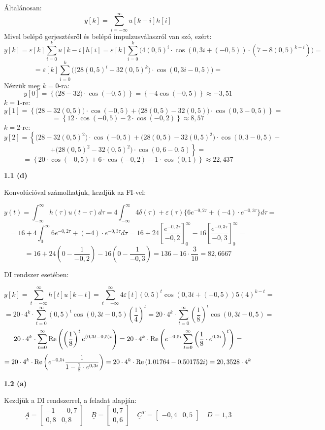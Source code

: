 \documentclass[12pt,a4paper]{article}
\newcommand\uuline[1]{\underline{\underline{#1}}}
\newcommand\uline[1]{\underline{#1}}
\begin{document}
Általánosan:
\[y[k] = \sum_{i=-\infty}^{\infty} u[k-i]h[i]\]
Mivel belépő gerjesztésről és belépő impulzusválaszról van szó, ezért:
\[y[k] = \varepsilon[k]\sum_{i=0}^{k} u[k-i]h[i] = \varepsilon[k]\sum_{i=0}^{k}\Big( 4(0,5)^i\cdot\cos(0,3i+(-0,5))\cdot(7-8(0,5)^{k-i}) \Big) =\]
\[= \varepsilon[k]\sum_{i=0}^{k}\Big(\big(28(0,5)^i-32 (0,5)^k\big)\cdot  \cos(0,3i-0,5)\Big) = \]
Nézzük meg $k=0$-ra:
\[y[0] = \left\{\big(28-32\big)\cdot  \cos(-0,5)\right\} = \left\{-4 \cos(-0,5)\right\} \approx -3,51\]
$k=1$-re:
\[y[1] = \left\{\big(28-32 (0,5)\big)\cdot  \cos(-0,5)+\big(28(0,5)-32 (0,5)\big)\cdot  \cos(0,3-0,5)\right\} = \]
\[= \left\{12\cdot \cos(-0,5)-2\cdot  \cos(-0,2)\right\} \approx 8,57\]
$k=2$-re:
\[y[2] = \left\{\big(28-32 (0,5)^2\big)\cdot  \cos(-0,5)+\big(28(0,5)-32 (0,5)^2\big)\cdot  \cos(0,3-0,5)+\right.\]
\[\left.+\big(28(0,5)^2-32 (0,5)^2\big)\cdot  \cos(0,6-0,5)\right\}=\]
\[= \left\{20\cdot\cos(-0,5)+6\cdot  \cos(-0,2)-1\cdot  \cos(0,1)\right\} \approx 22,437\]

\textbf{1.1 (d)}

Konvolúcióval számolhatjuk, kezdjük az FI-vel:

\[y(t) = \int_{-\infty}^{\infty} h(\tau)u(t-\tau) d\tau = 4\int_{-\infty}^{\infty} 4\delta(\tau)+\varepsilon(\tau)\{6e^{-0,2\tau}+(-4)\cdot e^{-0,3\tau}\} d\tau =\]
\[= 16 + 4\int_{0}^{\infty} 6e^{-0,2\tau}+(-4)\cdot e^{-0,3\tau} d\tau = 16 + 24\left[\frac{e^{-0,2\tau}}{-0,2}\right]_0^{\infty}-16\left[\frac{e^{-0,3\tau}}{-0,3}\right]_0^{\infty}=\]
\[= 16 + 24\left(0-\frac{1}{-0,2}\right)-16\left(0-\frac{1}{-0,3}\right) = 136 - 16\cdot\frac{3}{10} = 82,6667\]

DI rendszer esetében:

\[y[k] = \sum_{t=-\infty}^{\infty} h[t]u[k-t] = \sum_{t=-\infty}^{\infty} 4\varepsilon[t](0,5)^t\cos(0,3t+(-0,5))5(4)^{k-t} =\]
\[= 20\cdot4^k\cdot \sum_{t=0}^{\infty} (0,5)^t\cos(0,3t-0,5)\left(\frac{1}{4}\right)^{t} = 20\cdot4^k\cdot \sum_{t=0}^{\infty} \left(\frac{1}{8}\right)^{t}\cos(0,3t-0,5) = \]
\[20\cdot4^k\cdot \sum_{t=0}^{\infty} \hbox{Re}\left(\left(\frac{1}{8}\right)^{t} e^{(0,3t-0,5)i}\right) = 20\cdot4^k\cdot \hbox{Re}\left(e^{-0,5i} \sum_{t=0}^{\infty} \left(\frac{1}{8}\cdot e^{0,3i}\right)^{t}\right) =\]
\[ = 20\cdot4^k\cdot \hbox{Re}\left(e^{-0,5i} \frac{1}{1-\frac{1}{8}\cdot e^{0,3i}}\right) = 20\cdot4^k\cdot \hbox{Re}\left(1.01764 - 0.501752i\right) = 20,3528\cdot4^k\]

\textbf{1.2 (a)}

Kezdjük a DI rendszerrel, a feladat alapján:
\[\uuline{A} = \left[\begin{matrix}-1 & -0,7\\0,8 & 0,8\end{matrix}\right] \quad \uline{B}=\left[\begin{matrix}0,7\\0,6\end{matrix}\right] \quad \uline{C}^T = \left[\begin{matrix}-0,4 & 0,5\end{matrix}\right] \quad D = 1,3\]
\end{document}
